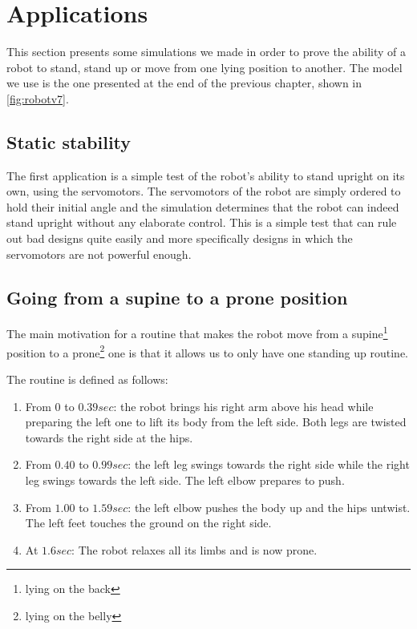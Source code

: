 \section{Applications}
This section presents some simulations we made in order to prove the ability of a robot to stand, stand up or move from one lying position to another. The model we use is the one presented at the end of the previous chapter, shown in \cref{fig:robotv7}.

\subsection{Static stability}
The first application is a simple test of the robot's ability to stand upright on its own, using the servomotors. The servomotors of the robot are simply ordered to hold their initial angle and the simulation determines that the robot can indeed stand upright without any elaborate control. This is a simple test that can rule out bad designs quite easily and more specifically designs in which the servomotors are not powerful enough.

\subsection{Going from a supine to a prone position}
The main motivation for a routine that makes the robot move from a supine\footnote{lying on the back}  position to a prone\footnote{lying on the belly} one is that it allows us to only have one standing up routine. 

The routine is defined as follows:\begin{enumerate}
\item From $0$ to $0.39sec$: the robot brings his right arm above his head while preparing the left one to lift its body from the left side. Both legs are twisted towards the right side at the hips.

\item From $0.40$ to $0.99sec$: the left leg swings towards the right side while the right leg swings towards the left side. The left elbow prepares to push.

\item From $1.00$ to $1.59sec$: the left elbow pushes the body up and the hips untwist. The left feet touches the ground on the right side.

\item At $1.6sec$: The robot relaxes all its limbs and is now prone.
\end{enumerate}

